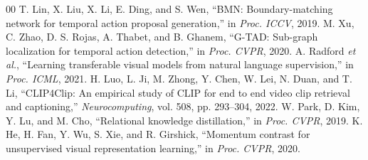 \documentclass{IEEEtran}
\begin{document}
\begin{thebibliography}{00}
 T. Lin, X. Liu, X. Li, E. Ding, and S. Wen, ``BMN: Boundary-matching network for temporal action proposal generation,'' in \textit{Proc. ICCV}, 2019.
 M. Xu, C. Zhao, D. S. Rojas, A. Thabet, and B. Ghanem, ``G-TAD: Sub-graph localization for temporal action detection,'' in \textit{Proc. CVPR}, 2020.
 A. Radford \textit{et al.}, ``Learning transferable visual models from natural language supervision,'' in \textit{Proc. ICML}, 2021.
 H. Luo, L. Ji, M. Zhong, Y. Chen, W. Lei, N. Duan, and T. Li, ``CLIP4Clip: An empirical study of CLIP for end to end video clip retrieval and captioning,'' \textit{Neurocomputing}, vol. 508, pp. 293--304, 2022.
 W. Park, D. Kim, Y. Lu, and M. Cho, ``Relational knowledge distillation,'' in \textit{Proc. CVPR}, 2019.
 K. He, H. Fan, Y. Wu, S. Xie, and R. Girshick, ``Momentum contrast for unsupervised visual representation learning,'' in \textit{Proc. CVPR}, 2020.
\end{thebibliography}
\end{document}

